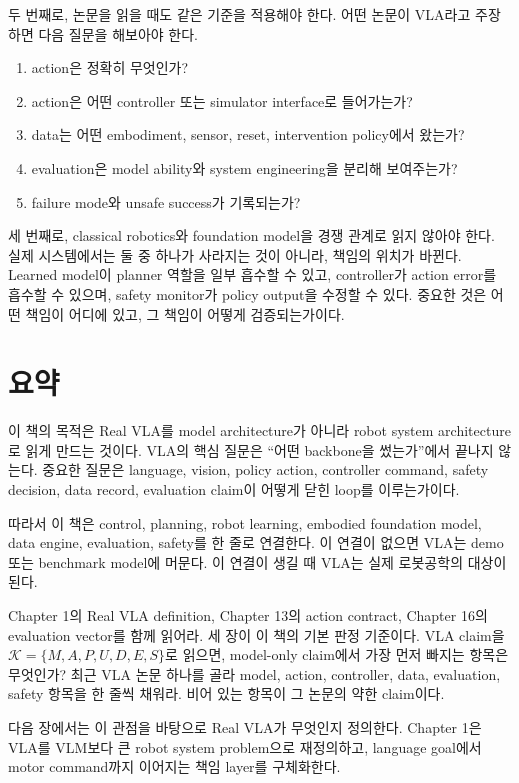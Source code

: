 두 번째로, 논문을 읽을 때도 같은 기준을 적용해야 한다. 어떤 논문이 VLA라고 주장하면 다음 질문을 해보아야 한다.

\begin{enumerate}
  \item action은 정확히 무엇인가?
  \item action은 어떤 controller 또는 simulator interface로 들어가는가?
  \item data는 어떤 embodiment, sensor, reset, intervention policy에서 왔는가?
  \item evaluation은 model ability와 system engineering을 분리해 보여주는가?
  \item failure mode와 unsafe success가 기록되는가?
\end{enumerate}

세 번째로, classical robotics와 foundation model을 경쟁 관계로 읽지 않아야 한다. 실제 시스템에서는 둘 중 하나가 사라지는 것이 아니라, 책임의 위치가 바뀐다. Learned model이 planner 역할을 일부 흡수할 수 있고, controller가 action error를 흡수할 수 있으며, safety monitor가 policy output을 수정할 수 있다. 중요한 것은 어떤 책임이 어디에 있고, 그 책임이 어떻게 검증되는가이다.

\section{요약}

이 책의 목적은 Real VLA를 model architecture가 아니라 robot system architecture로 읽게 만드는 것이다. VLA의 핵심 질문은 ``어떤 backbone을 썼는가''에서 끝나지 않는다. 중요한 질문은 language, vision, policy action, controller command, safety decision, data record, evaluation claim이 어떻게 닫힌 loop를 이루는가이다.

따라서 이 책은 control, planning, robot learning, embodied foundation model, data engine, evaluation, safety를 한 줄로 연결한다. 이 연결이 없으면 VLA는 demo 또는 benchmark model에 머문다. 이 연결이 생길 때 VLA는 실제 로봇공학의 대상이 된다.

\chapterwork
{Chapter 1의 Real VLA definition, Chapter 13의 action contract, Chapter 16의 evaluation vector를 함께 읽어라. 세 장이 이 책의 기본 판정 기준이다.}
{VLA claim을 $\mathcal{K}=\{M,A,P,U,D,E,S\}$로 읽으면, model-only claim에서 가장 먼저 빠지는 항목은 무엇인가?}
{최근 VLA 논문 하나를 골라 model, action, controller, data, evaluation, safety 항목을 한 줄씩 채워라. 비어 있는 항목이 그 논문의 약한 claim이다.}

다음 장에서는 이 관점을 바탕으로 Real VLA가 무엇인지 정의한다. Chapter 1은 VLA를 VLM보다 큰 robot system problem으로 재정의하고, language goal에서 motor command까지 이어지는 책임 layer를 구체화한다.
